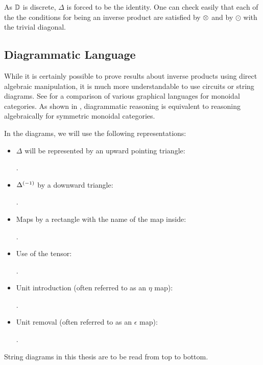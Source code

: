 As $\mathbb{D}$ is discrete, $\Delta$ is forced to be the identity. One can check easily that each of the
the conditions for being an inverse product are satisfied by $\otimes$ and by $\odot$ with the trivial diagonal.

\subsection{Diagrammatic Language} %
\label{sub:diagrammatic_language}

While it is certainly possible to prove results about inverse products using direct algebraic
manipulation, it is much more understandable to use circuits or string diagrams. See
\cite{selinger11:graphical} for a comparison of various graphical languages for monoidal categories.
As shown in
\cite{street-ross-1991-GTC-I}, diagrammatic reasoning is equivalent to reasoning algebraically for
symmetric monoidal categories.

In the diagrams, we will use the following representations:
\begin{itemize}
  \item $\Delta$ will be represented by an upward pointing triangle: .
  \item ${\Delta}^{(-1)}$ by a downward triangle: .
  \item Maps by a rectangle with the name of the map inside: .
  \item Use of the tensor: .
  \item Unit introduction (often referred to as an $\eta$ map): .
  \item Unit removal (often referred to as an $\epsilon$ map): .
\end{itemize}
String diagrams in this thesis are to be read from top to bottom.

